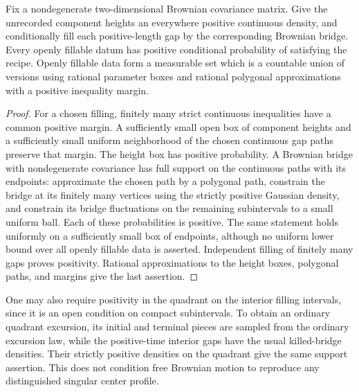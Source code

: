 \begin{lemma}\label{view:positive-fill}
Fix a nondegenerate two-dimensional Brownian covariance matrix.  Give the
unrecorded component heights an everywhere positive continuous density,
and conditionally fill each positive-length gap by the corresponding
Brownian bridge.  Every openly fillable datum has positive conditional
probability of satisfying the recipe.  Openly fillable data form a
measurable set which is a countable union of versions using rational
parameter boxes and rational polygonal approximations with a positive
inequality margin.
\end{lemma}

\begin{proof}
For a chosen filling, finitely many strict continuous inequalities have a
common positive margin.  A sufficiently small open box of component
heights and a sufficiently small uniform neighborhood of the chosen
continuous gap paths preserve that margin.  The height box has positive
probability.  A Brownian bridge with nondegenerate covariance has full
support on the continuous paths with its endpoints: approximate the chosen
path by a polygonal path, constrain the bridge at its finitely many
vertices using the strictly positive Gaussian density, and constrain its
bridge fluctuations on the remaining subintervals to a small uniform
ball.  Each of these probabilities is positive.  The same statement holds
uniformly on a sufficiently small box of endpoints, although no uniform
lower bound over all openly fillable data is asserted.  Independent filling
of finitely many gaps proves positivity.  Rational approximations to the
height boxes, polygonal paths, and margins give the last assertion.
\end{proof}

One may also require positivity in the quadrant on the interior filling
intervals, since it is an open condition on compact subintervals.  To obtain
an ordinary quadrant excursion, its initial and terminal pieces are
sampled from the ordinary excursion law, while the positive-time interior
gaps have the usual killed-bridge densities.  Their strictly positive
densities on the quadrant give the same support assertion.  This does not
condition free Brownian motion to reproduce any distinguished singular
center profile.

